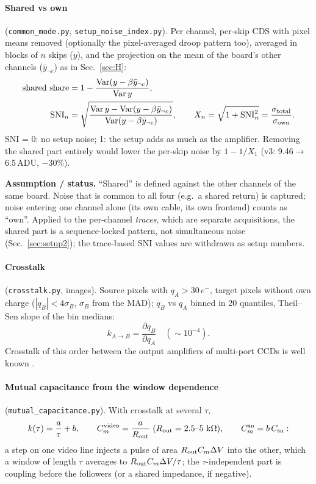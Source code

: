 \documentclass[10pt,a4paper]{article}
\newcommand{\code}[1]{\texttt{\small #1}}
\newcommand{\caveat}[1]{\par\smallskip\noindent\colorbox{orange!10}{\parbox{\dimexpr\linewidth-2\fboxsep}{\small\textbf{Assumption / status.} #1}}\par\smallskip}
\begin{document}
\paragraph{Shared vs own} (\code{common\_mode.py}, \code{setup\_noise\_index.py}). Per channel, per-skip CDS with pixel
means removed (optionally the pixel-averaged droop pattern too), averaged in blocks of $n$ skips ($y$), and the
projection on the mean of the board's other channels ($\bar y_{\neg c}$) as in Sec.~\ref{sec:H}:
\begin{align}
\text{shared share}&=1-\frac{\operatorname{Var}(y-\beta\bar y_{\neg c})}{\operatorname{Var}y},\\
\text{SNI}_n&=\sqrt{\frac{\operatorname{Var}y-\operatorname{Var}(y-\beta\bar y_{\neg c})}{\operatorname{Var}(y-\beta\bar y_{\neg c})}},\qquad
X_n=\sqrt{1+\text{SNI}_n^2}=\frac{\sigma_{\rm total}}{\sigma_{\rm own}} .
\end{align}
SNI = 0: no setup noise; 1: the setup adds as much as the amplifier. Removing the shared part entirely would lower the
per-skip noise by $1-1/X_1$ (v3: 9.46$\to$6.5\,ADU, $-30\%$).
\caveat{``Shared'' is defined against the other channels of the same board. Noise that is common to all four (e.g.\ a
shared return) is captured; noise entering one channel alone (its own cable, its own frontend) counts as ``own''. Applied to the per-channel \emph{traces}, which are separate
acquisitions, the shared part is a sequence-locked pattern, not simultaneous noise (Sec.~\ref{sec:setup2}); the
trace-based SNI values are withdrawn as setup numbers.}

\paragraph{Crosstalk} (\code{crosstalk.py}, images). Source pixels with $q_A>30\,e^-$, target pixels without own
charge ($|q_B|<4\sigma_B$, $\sigma_B$ from the MAD); $q_B$ vs $q_A$ binned in 20 quantiles, Theil--Sen slope \cite{theil1950,sen1968} of the bin
medians:
\begin{equation}
k_{A\to B}=\frac{\partial q_B}{\partial q_A}\quad(\sim10^{-4}).
\end{equation}
Crosstalk of this order between the output amplifiers of multi-port CCDs is well known \cite{freyhammer2001}.

\paragraph{Mutual capacitance from the window dependence} (\code{mutual\_capacitance.py}). With crosstalk at several
$\tau$,
\begin{equation}
k(\tau)=\frac a\tau+b,\qquad C_m^{\rm video}=\frac a{R_{\rm out}}\ (R_{\rm out}=2.5\text{--}5\ \text{k}\Omega),\qquad
C_m^{\rm sn}=b\,C_{\rm sn} :
\end{equation}
a step on one video line injects a pulse of area $R_{\rm out}C_m\Delta V$ into the other, which a window of length
$\tau$ averages to $R_{\rm out}C_m\Delta V/\tau$; the $\tau$-independent part is coupling before the followers (or a
shared impedance, if negative).
\end{document}
